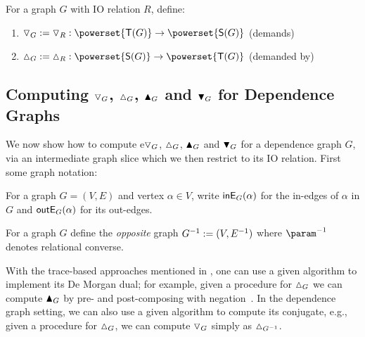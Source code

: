 
\begin{definition}
   For a graph $G$ with IO relation $R$, define:
   \begin{enumerate}
      \item $\demandsR_G \eqdef \demandsR_{R}: \powerset{\sinks{G}} \to \powerset{\sources{G}}$ \hfill
      (demands)
      \item $\demandedByR_G \eqdef \demandedByR_{R}: \powerset{\sources{G}} \to \powerset{\sinks{G}}$ \hfill
      (demanded by)
   \end{enumerate}
\end{definition}

\subsection{Computing $\triangledown_G$, $\demandedByR_G$, $\blacktriangle_{G}$ and $\blacktriangledown_{G}$ for
Dependence Graphs}
\label{sec:conjugate:dependence-graph-algos}

We now show how to compute e$\triangledown_{G}$, $\demandedByR_{G}$, $\blacktriangle_{G}$ and $\blacktriangledown_{G}$ for
a dependence graph $G$, via an intermediate graph slice which we then restrict to its IO relation. First some
graph notation:

\begin{definition}
For a graph $G=(V,E)$ and vertex $\alpha \in V$, write $\textup{\textsf{inE}}_{G}(\alpha)$ for the in-edges of $\alpha$ in $G$
and $\textup{\textsf{outE}}_{G}(\alpha)$ for its out-edges.
\end{definition}

\begin{definition}
For a graph $G$ define the \emph{opposite} graph $G^{-1} := (V,E^{-1})$ where $\param^{-1}$ denotes
relational converse.
\end{definition}

With the trace-based approaches mentioned in , one can use a given algorithm to implement
its De Morgan dual; for example, given a procedure for $\demandedByR_{G}$ we can compute $\blacktriangle_{G}$ by
pre- and post-composing with negation~\cite{perera22}. In the dependence graph setting, we can also use a given
algorithm to compute its conjugate, e.g., given a procedure for $\demandedByR_{G}$, we can compute
$\triangledown_{G}$ simply as $\demandedByR_{\opGraph{G}}$.

